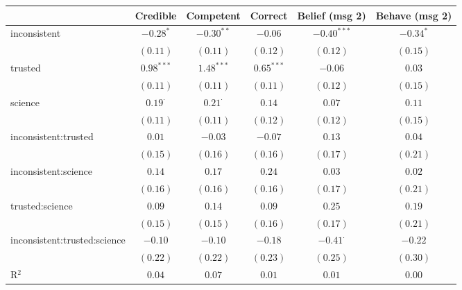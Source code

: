 
\begin{table}
\begin{center}
\begin{tabular}{l c c c c c}
\hline
 & Credible & Competent & Correct & Belief (msg 2) & Behave (msg 2) \\
\hline
inconsistent                 & $-0.28^{*}$    & $-0.30^{**}$   & $-0.06$      & $-0.40^{***}$   & $-0.34^{*}$ \\
                             & $(0.11)$       & $(0.11)$       & $(0.12)$     & $(0.12)$        & $(0.15)$    \\
trusted                      & $0.98^{***}$   & $1.48^{***}$   & $0.65^{***}$ & $-0.06$         & $0.03$      \\
                             & $(0.11)$       & $(0.11)$       & $(0.11)$     & $(0.12)$        & $(0.15)$    \\
science                      & $0.19^{\cdot}$ & $0.21^{\cdot}$ & $0.14$       & $0.07$          & $0.11$      \\
                             & $(0.11)$       & $(0.11)$       & $(0.12)$     & $(0.12)$        & $(0.15)$    \\
inconsistent:trusted         & $0.01$         & $-0.03$        & $-0.07$      & $0.13$          & $0.04$      \\
                             & $(0.15)$       & $(0.16)$       & $(0.16)$     & $(0.17)$        & $(0.21)$    \\
inconsistent:science         & $0.14$         & $0.17$         & $0.24$       & $0.03$          & $0.02$      \\
                             & $(0.16)$       & $(0.16)$       & $(0.16)$     & $(0.17)$        & $(0.21)$    \\
trusted:science              & $0.09$         & $0.14$         & $0.09$       & $0.25$          & $0.19$      \\
                             & $(0.15)$       & $(0.15)$       & $(0.16)$     & $(0.17)$        & $(0.21)$    \\
inconsistent:trusted:science & $-0.10$        & $-0.10$        & $-0.18$      & $-0.41^{\cdot}$ & $-0.22$     \\
                             & $(0.22)$       & $(0.22)$       & $(0.23)$     & $(0.25)$        & $(0.30)$    \\
\hline
R$^2$                        & $0.04$         & $0.07$         & $0.01$       & $0.01$          & $0.00$      \\

\end{tabular}
\end{center}
\end{table}
